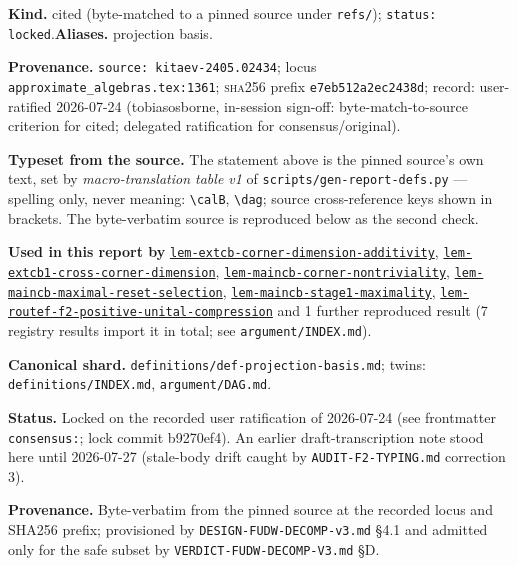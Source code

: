 \begin{defnote}
\textbf{Kind.} cited (byte-matched to a pinned source under \texttt{refs/}); \texttt{status: locked}.\quad\textbf{Aliases.} projection basis.
\par
\textbf{Provenance.} \texttt{source: kitaev-\allowbreak{}2405.\allowbreak{}02434}; locus \texttt{approximate\_algebras.\allowbreak{}tex:\allowbreak{}1361}; \textsc{sha256} prefix \texttt{e7eb512a2ec2438d}; record: user-\allowbreak{}ratified 2026-\allowbreak{}07-\allowbreak{}24 (tobiasosborne,\allowbreak{} in-\allowbreak{}session sign-\allowbreak{}off:\allowbreak{} byte-\allowbreak{}match-\allowbreak{}to-\allowbreak{}source criterion for cited;\allowbreak{} delegated ratification for consensus/\allowbreak{}original).
\par
\textbf{Typeset from the source.} The statement above is the pinned source's own text, set by \emph{macro-translation table v1} of \texttt{scripts/gen-report-defs.py} --- spelling only, never meaning: \texttt{\textbackslash{}calB}, \texttt{\textbackslash{}dag}; source cross-reference keys shown in brackets. The byte-verbatim source is reproduced below as the second check.
\par
\textbf{Used in this report by} \hyperref[lem:extcb-corner-dimension-additivity]{\texttt{lem-\allowbreak{}extcb-\allowbreak{}corner-\allowbreak{}dimension-\allowbreak{}additivity}}, \hyperref[lem:extcb1-cross-corner-dimension]{\texttt{lem-\allowbreak{}extcb1-\allowbreak{}cross-\allowbreak{}corner-\allowbreak{}dimension}}, \hyperref[lem:maincb-corner-nontriviality]{\texttt{lem-\allowbreak{}maincb-\allowbreak{}corner-\allowbreak{}nontriviality}}, \hyperref[lem:maincb-maximal-reset-selection]{\texttt{lem-\allowbreak{}maincb-\allowbreak{}maximal-\allowbreak{}reset-\allowbreak{}selection}}, \hyperref[lem:maincb-stage1-maximality]{\texttt{lem-\allowbreak{}maincb-\allowbreak{}stage1-\allowbreak{}maximality}}, \hyperref[lem:routef-f2-positive-unital-compression]{\texttt{lem-\allowbreak{}routef-\allowbreak{}f2-\allowbreak{}positive-\allowbreak{}unital-\allowbreak{}compression}} and 1 further reproduced result (7 registry results import it in total; see \texttt{argument/INDEX.md}).
\par
\textbf{Canonical shard.} \texttt{definitions/\allowbreak{}def-\allowbreak{}projection-\allowbreak{}basis.\allowbreak{}md}; twins: \texttt{definitions/INDEX.md}, \texttt{argument/DAG.md}.
\par
\textbf{Status.} Locked on the recorded user ratification of 2026-07-24 (see
frontmatter \texttt{consensus:\allowbreak{}}; lock commit b9270ef4). An earlier draft-transcription
note stood here until 2026-07-27 (stale-body drift caught by
\texttt{AUDIT-\allowbreak{}F2-\allowbreak{}TYPING.\allowbreak{}md} correction 3).

\textbf{Provenance.} Byte-verbatim from the pinned source at the recorded locus
and SHA256 prefix; provisioned by \texttt{DESIGN-\allowbreak{}FUDW-\allowbreak{}DECOMP-\allowbreak{}v3.\allowbreak{}md} \S{}4.1 and admitted
only for the safe subset by \texttt{VERDICT-\allowbreak{}FUDW-\allowbreak{}DECOMP-\allowbreak{}V3.\allowbreak{}md} \S{}D.
\end{defnote}

